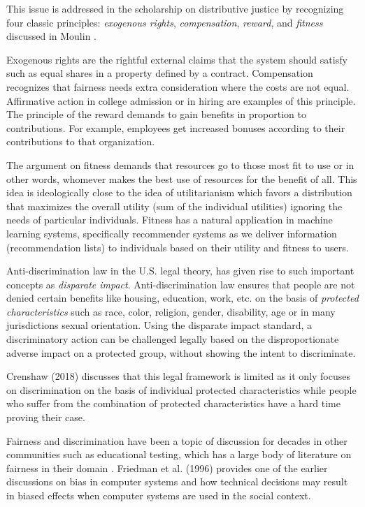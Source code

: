     This issue is addressed in the scholarship on distributive justice by recognizing four classic principles: \textit{exogenous rights}, \textit{compensation}, \textit{reward}, and  \textit{fitness} discussed in Moulin \cite{Moulin:FairDivision}. 
    
    Exogenous rights are the rightful external claims that the system should satisfy such as equal shares in a property defined by a contract. Compensation recognizes that fairness needs extra consideration where the costs are not equal. Affirmative action in college admission or in hiring are examples of this principle. The principle of the reward demands to gain benefits in proportion to contributions. For example, employees get increased bonuses according to their contributions to that organization.
    
    The argument on fitness demands that resources go to those most fit to use or in other words, whomever makes the best use of resources for the benefit of all. This idea is ideologically close to the idea of utilitarianism which favors a distribution that maximizes the overall utility (sum of the individual utilities) ignoring the needs of particular individuals. Fitness has a natural application in machine learning systems, specifically recommender systems as we deliver information (recommendation lists) to individuals based on their utility and fitness to users.
    
    Anti-discrimination law in the U.S. legal theory, has given rise to such important concepts as \textit{disparate impact}. Anti-discrimination law ensures that people are not denied certain benefits like housing, education, work, etc. on the basis of \textit{protected characteristics} such as race, color, religion, gender, disability, age or in many jurisdictions sexual orientation. Using the disparate impact standard, a discriminatory action can be challenged legally based on the disproportionate adverse impact on a protected group, without showing the intent to discriminate.
    
    Crenshaw (2018) \cite{clark2018demarginalizing} discusses that this legal framework is limited as it only focuses on discrimination on the basis of individual protected characteristics while people who suffer from the combination of protected characteristics have a hard time proving their case.
    
    Fairness and discrimination have been a topic of discussion for decades in other communities such as educational testing, which has a large body of literature on fairness in their domain \cite{Hutchinson2019history}. Friedman et al. (1996) \cite{Friedman1996Bias} provides one of the earlier discussions on bias in computer systems and how technical decisions may result in biased effects when computer systems are used in the social context. 
    

